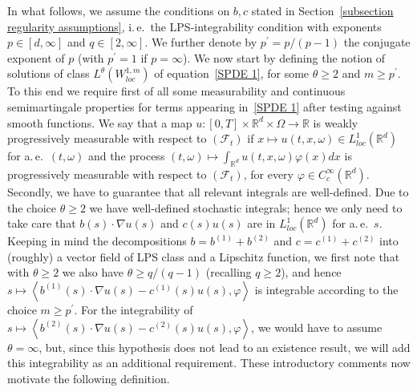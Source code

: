 \documentclass[a4paper,10pt]{article}
\begin{document}
In what follows, we assume the conditions on $b,c$ stated in Section~\ref{subsection regularity assumptions}, i.\,e.\ the LPS-integrability condition with exponents $p \in [d,\infty]$ and $q \in [2,\infty]$. We further denote by $p^{\prime}=p/(p-1)$ the conjugate exponent of $p$ (with $p^{\prime}=1$ if $p=\infty$). We now start by defining the notion of solutions of class $L^{\theta}(W_{loc}^{1,m})$ of equation~\eqref{SPDE 1}, for some  $\theta\geq2$ and $m\geq p^{\prime}$. To this end we require first of all some measurability and continuous semimartingale properties for terms appearing in~\eqref{SPDE 1} after testing against smooth functions. We say that a map $u \colon [0,T] \times \mathbb{R}^{d} \times \Omega \rightarrow \mathbb{R}$ is weakly progressively measurable with respect to $(\mathcal{F}_{t})$ if $x\mapsto u(t,x,\omega)  \in L_{loc}^{1}(\mathbb{R}^{d})$ for a.\,e.\ $(t,\omega)$ and the process $(t,\omega)  \mapsto \int_{\mathbb{R}^{d}} u(t,x,\omega) \varphi(x) dx$ is progressively measurable 
with 
respect to $(\mathcal{F}_{t})$, for every
$\varphi\in C_{c}^{\infty}(\mathbb{R}^{d})$. Secondly, we have to guarantee that all relevant integrals are well-defined. Due to the choice $\theta\geq2$ we have well-defined stochastic integrals; hence we only need to take care that $b(s) \cdot\nabla u(s)$ and $c(s) u(s)$ are in $L_{loc}^{1}(\mathbb{R}^{d})$ for a.\,e.\ $s$. Keeping in mind the decompositions $b = b^{(1)} + b^{(2)}$ and $c = c^{(1)} + c^{(2)}$ into (roughly) a vector field of LPS class and a Lipschitz function, we first note that with $\theta\geq2$ we also have $\theta\geq q/(q-1)$ (recalling $q\geq2$), and hence $s\mapsto\left\langle b^{(1)}(s) \cdot\nabla u(s)-c^{(1)}(s)  u(s) ,\varphi\right\rangle $ is integrable according to the choice $m\geq p^{\prime}$. For the integrability of $s\mapsto\left\langle b^{(2)}(s)  \cdot\nabla u(s) -c^{(2)}(s) u(s) ,\varphi\right\rangle$, we would have to assume $\theta=\infty$, but, since this hypothesis does not lead to an existence result, we will add this integrability as an additional requirement. 
These introductory comments now motivate the following definition.
\end{document}

